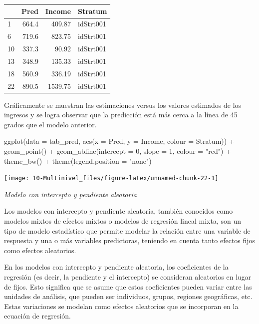\documentclass[
  12pt,
]{book}
\newenvironment{Shaded}{\begin{snugshade}}{\end{snugshade}}
\newcommand{\AttributeTok}[1]{\textcolor[rgb]{0.77,0.63,0.00}{#1}}
\newcommand{\DecValTok}[1]{\textcolor[rgb]{0.00,0.00,0.81}{#1}}
\newcommand{\FunctionTok}[1]{\textcolor[rgb]{0.00,0.00,0.00}{#1}}
\newcommand{\NormalTok}[1]{#1}
\newcommand{\SpecialCharTok}[1]{\textcolor[rgb]{0.00,0.00,0.00}{#1}}
\newcommand{\StringTok}[1]{\textcolor[rgb]{0.31,0.60,0.02}{#1}}
\begin{document}
\begin{tabular}{l|r|r|l}
\hline
  & Pred & Income & Stratum\\
\hline
1 & 664.4 & 409.87 & idStrt001\\
\hline
6 & 719.6 & 823.75 & idStrt001\\
\hline
10 & 337.3 & 90.92 & idStrt001\\
\hline
13 & 348.9 & 135.33 & idStrt001\\
\hline
18 & 560.9 & 336.19 & idStrt001\\
\hline
22 & 890.5 & 1539.75 & idStrt001\\
\hline
\end{tabular}

Gráficamente se muestran las estimaciones versus los valores estimados de los ingresos y se logra observar que la predicción está más cerca a la línea de 45 grados que el modelo anterior.

\begin{Shaded}
\begin{Highlighting}[]
\FunctionTok{ggplot}\NormalTok{(}\AttributeTok{data =}\NormalTok{ tab\_pred, }\FunctionTok{aes}\NormalTok{(}\AttributeTok{x =}\NormalTok{ Pred, }\AttributeTok{y =}\NormalTok{ Income, }\AttributeTok{colour =}\NormalTok{ Stratum)) }\SpecialCharTok{+} 
  \FunctionTok{geom\_point}\NormalTok{() }\SpecialCharTok{+} \FunctionTok{geom\_abline}\NormalTok{(}\AttributeTok{intercept =} \DecValTok{0}\NormalTok{, }\AttributeTok{slope =} \DecValTok{1}\NormalTok{, }\AttributeTok{colour =} \StringTok{"red"}\NormalTok{) }\SpecialCharTok{+}
  \FunctionTok{theme\_bw}\NormalTok{() }\SpecialCharTok{+} \FunctionTok{theme}\NormalTok{(}\AttributeTok{legend.position =} \StringTok{"none"}\NormalTok{) }
\end{Highlighting}
\end{Shaded}

\texttt{[image: 10-Multinivel\_files/figure-latex/unnamed-chunk-22-1]}

\emph{Modelo con intercepto y pendiente aleatoria}

Los modelos con intercepto y pendiente aleatoria, también conocidos como modelos mixtos de efectos mixtos o modelos de regresión lineal mixta, son un tipo de modelo estadístico que permite modelar la relación entre una variable de respuesta y una o más variables predictoras, teniendo en cuenta tanto efectos fijos como efectos aleatorios.

En los modelos con intercepto y pendiente aleatoria, los coeficientes de la regresión (es decir, la pendiente y el intercepto) se consideran aleatorios en lugar de fijos. Esto significa que se asume que estos coeficientes pueden variar entre las unidades de análisis, que pueden ser individuos, grupos, regiones geográficas, etc. Estas variaciones se modelan como efectos aleatorios que se incorporan en la ecuación de regresión.
\end{document}
